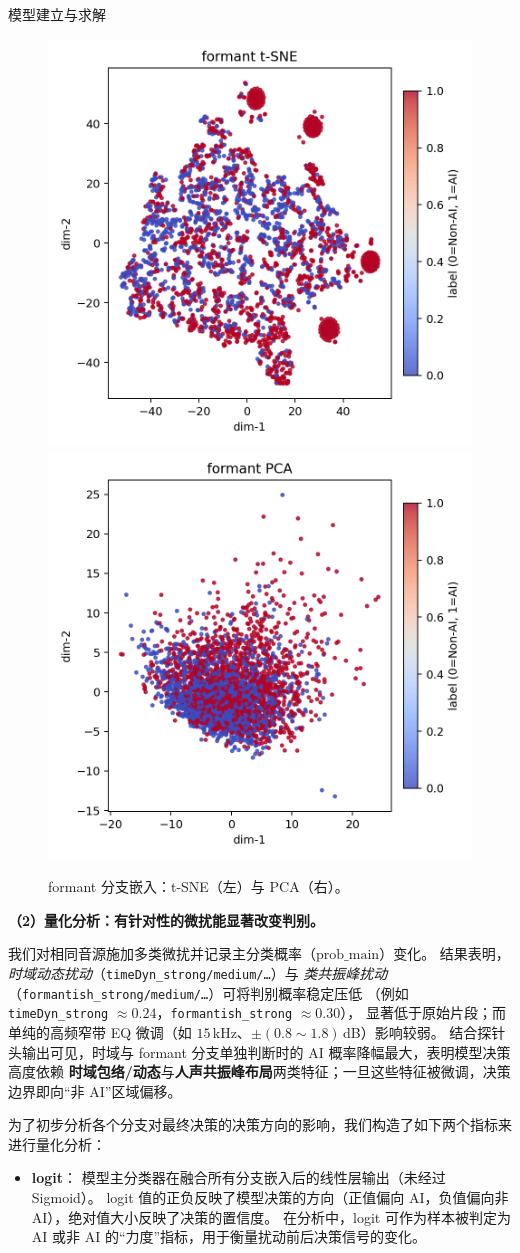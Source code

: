 \documentclass[aspectratio=169]{beamer}
\providecommand{\paragraph}[1]{\smallskip\textbf{#1}\par}
\begin{document}
\begin{frame}{模型建立与求解}
\begin{figure}[H]
  \centering
  \includegraphics[width=.4\linewidth]{images_in_paper/embed_formant_tsne.png}
  \includegraphics[width=.4\linewidth]{images_in_paper/embed_formant_pca.png}
  \caption{formant 分支嵌入：t-SNE（左）与 PCA（右）。}
  \label{fig:formant_tsne}
  \label{fig:formant_pca}
\end{figure}

\paragraph{（2）量化分析：有针对性的微扰能显著改变判别。}
我们对相同音源施加多类微扰并记录主分类概率（$\mathrm{prob\_main}$）变化。
结果表明，\emph{时域动态扰动}（\texttt{timeDyn\_strong/medium/\ldots}）与
\emph{类共振峰扰动}（\texttt{formantish\_strong/medium/\ldots}）可将判别概率稳定压低
（例如 \texttt{timeDyn\_strong} $\approx 0.24$，\texttt{formantish\_strong} $\approx 0.30$），
显著低于原始片段；而单纯的高频窄带 EQ 微调（如 $15$\,kHz、$\pm(0.8\!\sim\!1.8)$\,dB）影响较弱。
结合探针头输出可见，时域与 formant 分支单独判断时的 AI 概率降幅最大，表明模型决策高度依赖
\textbf{时域包络/动态}与\textbf{人声共振峰布局}两类特征；一旦这些特征被微调，决策边界即向“非 AI”区域偏移。

为了初步分析各个分支对最终决策的决策方向的影响，我们构造了如下两个指标来进行量化分析：
\begin{itemize}
  \item \textbf{logit}：
  模型主分类器在融合所有分支嵌入后的线性层输出（未经过 Sigmoid）。
  logit 值的正负反映了模型决策的方向（正值偏向 AI，负值偏向非 AI），绝对值大小反映了决策的置信度。
  在分析中，logit 可作为样本被判定为 AI 或非 AI 的“力度”指标，用于衡量扰动前后决策信号的变化。


\end{itemize}
\end{frame}
\end{document}

